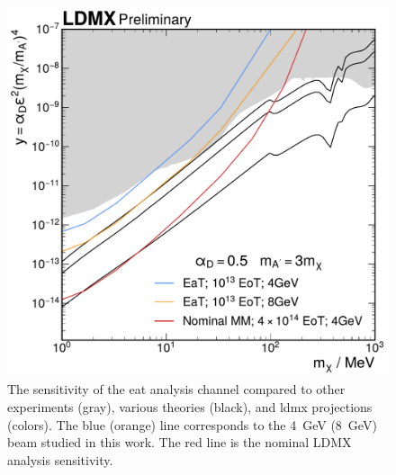 \begin{figure}
  \centering
  \includegraphics[width=\textwidth]{figures/ldmx/analysis/reach.pdf}
  \caption{%
    The sensitivity of the \ac{eat} analysis channel compared to
    other experiments (gray), various theories (black), and \ac{ldmx} projections (colors).
    The blue (orange) line corresponds to the \qty{4}{\GeV} (\qty{8}{\GeV}) beam studied in this work.
    The red line is the nominal LDMX analysis sensitivity.
  }
  \label{fig:reach}
\end{figure}
